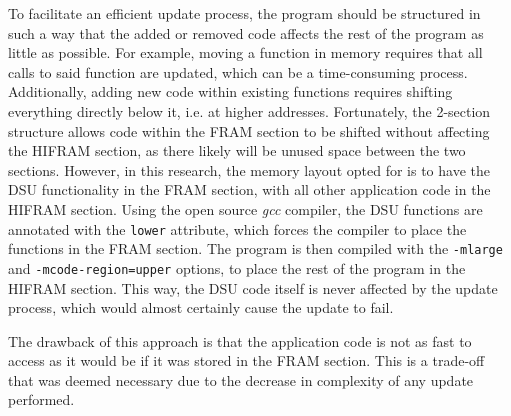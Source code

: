To facilitate an efficient update process, the program should be structured in such a way that the added or removed code affects the rest of the program as little as possible. For example, moving a function in memory requires that all calls to said function are updated, which can be a time-consuming process. Additionally, adding new code within existing functions requires shifting everything directly below it, i.e. at higher addresses. Fortunately, the 2-section structure allows code within the FRAM section to be shifted without affecting the HIFRAM section, as there likely will be unused space between the two sections. However, in this research, the memory layout opted for is to have the DSU functionality in the FRAM section, with all other application code in the HIFRAM section. Using the open source \textit{gcc} compiler, the DSU functions are annotated with the \verb|lower| attribute, which forces the compiler to place the functions in the FRAM section. The program is then compiled with the \verb|-mlarge| and \verb|-mcode-region=upper| options, to place the rest of the program in the HIFRAM section. This way, the DSU code itself is never affected by the update process, which would almost certainly cause the update to fail. 

The drawback of this approach is that the application code is not as fast to access as it would be if it was stored in the FRAM section. This is a trade-off that was deemed necessary due to the decrease in complexity of any update performed.  
